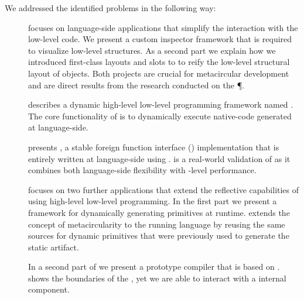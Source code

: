 We addressed the identified problems in the following way:
\begin{description}	
	\item[] focuses on language-side applications that simplify the interaction with the low-level code.
	We present a custom inspector framework that is required to visualize low-level structures.
	As a second part we explain how we introduced first-class layouts and slots to \PH to reify the low-level structural layout of objects.
	Both projects are crucial for metacircular \VM development and are direct results from the research conducted on the \P \VM.
	
	\item[] describes a dynamic high-level low-level programming framework named \B.
	The core functionality of \B is to dynamically execute native-code generated at language-side.
		
	\item[] presents \NB, a stable foreign function interface (\FFI) implementation that is entirely written at language-side using \B.
	\NB is a real-world validation of \B as it combines both language-side flexibility with \VM-level performance.
	
	\item[] focuses on two further \B applications that extend the reflective capabilities of \PH using high-level low-level programming.
	In the first part we present \WF a framework for dynamically generating primitives at runtime.
	\WF extends the concept of metacircularity to the running language by reusing the same sources for dynamic primitives that were previously used to generate the static \VM artifact.
		
	In a second part of  we present \NBJ a prototype \JIT compiler that is based on \B.
	\NBJ shows the boundaries of the \B, yet we are able to interact with a \VM internal component.
\end{description}


